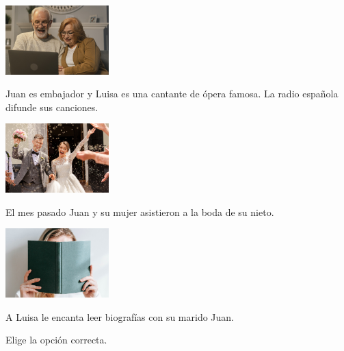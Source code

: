 \begin{question}\vspace*{-20pt}
\begin{instance}  
\begin{statement}
\parbox{200pt}{\raggedright 

\begin{center}
	\includegraphics[width=0.3\textwidth]{NonQuestions/Figure_Slide_6a.jpg}
\end{center}
	
Juan es embajador y Luisa es una cantante de ópera famosa. La radio española difunde sus canciones. 
	
	}\hspace*{2cm}\parbox{200pt}{\raggedright 

\begin{center}
	\includegraphics[width=0.3\textwidth]{NonQuestions/Figure_Slide_6b.jpg}
\end{center}
	
El mes pasado Juan y su mujer asistieron a la boda de su nieto. \vspace*{60pt}
	
	}\hspace*{2cm}\parbox{200pt}{\raggedright 

\begin{center}
	\includegraphics[width=0.3\textwidth]{NonQuestions/Figure_Slide_6c.jpg}
\end{center}
	
A Luisa le encanta leer biografías con su marido Juan. \vspace*{60pt}
	
	}\vspace*{40pt}
\end{statement} 
\begin{mcq}[standalone=true,no-label=true]      
\begin{stem}
Elige la opción correcta.


\end{stem}
\end{mcq}
\end{instance}
\end{question}
